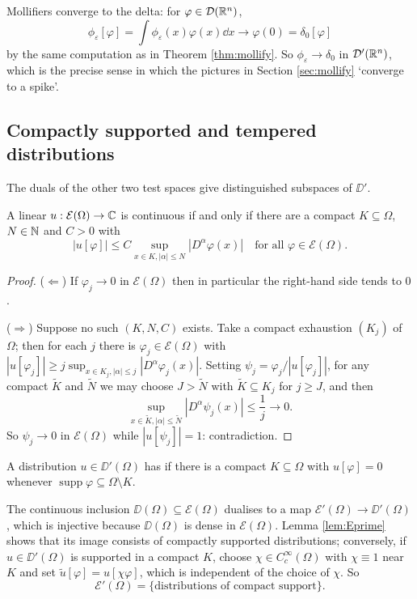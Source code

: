 \documentclass[a4paper]{scrartcl}
\newcommand{\wt}{\widetilde}
\newcommand{\Ecal}{\mathcal{E}}
\DeclareMathOperator{\supp}{supp}
\begin{document}
\begin{example}
	Mollifiers converge to the delta: for $\varphi \in \mathcal{D}(\mathbb{R}^n)$,
	$$\phi_\varepsilon[\varphi]=\int\phi_\varepsilon(x)\varphi(x)\dd x \to \varphi(0)=\delta_0[\varphi]$$
	by the same computation as in Theorem \ref{thm:mollify}. So $\phi_\varepsilon \to \delta_0$ in $\mathcal{D}'(\mathbb{R}^n)$, which is the precise sense in which the pictures in Section \ref{sec:mollify} `converge to a spike'.
\end{example}

\subsection{Compactly supported and tempered distributions}

The duals of the other two test spaces give distinguished subspaces of $\DD'$.

\begin{lemma}\label{lem:Eprime}
	A linear $u : \Ecal(\Omega)\to\C$ is continuous if and only if there are a compact $K \subseteq \Omega$, $N \in \mathbb{N}$ and $C>0$ with
	$$|u[\varphi]|\le C\sup_{x\in K, |\alpha|\le N}|D^\alpha\varphi(x)| \quad\text{for all }\varphi\in\Ecal(\Omega).$$
\end{lemma}

\begin{proof}
	($\Leftarrow$) If $\varphi_j\to0$ in $\Ecal(\Omega)$ then in particular the right-hand side tends to $0$.

	($\Rightarrow$) Suppose no such $(K,N,C)$ exists. Take a compact exhaustion $(K_j)$ of $\Omega$; then for each $j$ there is $\varphi_j\in\Ecal(\Omega)$ with $|u[\varphi_j]|\ge j\sup_{x\in K_j,|\alpha|\le j}|D^\alpha\varphi_j(x)|$. Setting $\psi_j=\varphi_j/|u[\varphi_j]|$, for any compact $\wt K$ and $\wt N$ we may choose $J>\wt N$ with $\wt K\subseteq K_j$ for $j \ge J$, and then
	$$\sup_{x\in\wt K,|\alpha|\le\wt N}|D^\alpha\psi_j(x)|\le\frac1j\to0.$$
	So $\psi_j\to0$ in $\Ecal(\Omega)$ while $|u[\psi_j]|=1$: contradiction.
\end{proof}

\begin{definition}
	A distribution $u \in \DD'(\Omega)$ has  if there is a compact $K\subseteq\Omega$ with $u[\varphi]=0$ whenever $\supp\varphi\subseteq\Omega\setminus K$.
\end{definition}

The continuous inclusion $\DD(\Omega)\subseteq\Ecal(\Omega)$ dualises to a map $\Ecal'(\Omega)\to\DD'(\Omega)$, which is injective because $\DD(\Omega)$ is dense in $\Ecal(\Omega)$. Lemma \ref{lem:Eprime} shows that its image consists of compactly supported distributions; conversely, if $u \in \DD'(\Omega)$ is supported in a compact $K$, choose $\chi \in C_c^\infty(\Omega)$ with $\chi\equiv1$ near $K$ and set $\wt u[\varphi]=u[\chi\varphi]$, which is independent of the choice of $\chi$. So
$$\Ecal'(\Omega)=\{\text{distributions of compact support}\}.$$
\end{document}
